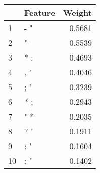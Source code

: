 \begin{tabular}{llr}
\toprule
{} & Feature &  Weight \\
\midrule
1  &     - " &  0.5681 \\
2  &     " - &  0.5539 \\
3  &     * : &  0.4693 \\
4  &     . " &  0.4046 \\
5  &     ; ' &  0.3239 \\
6  &     * ; &  0.2943 \\
7  &     " * &  0.2035 \\
8  &     ? ' &  0.1911 \\
9  &     : ' &  0.1604 \\
10 &     : " &  0.1402 \\
\bottomrule
\end{tabular}
